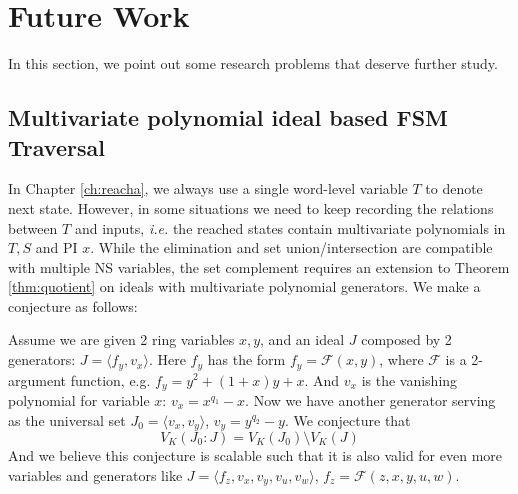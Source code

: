 \section{Future Work}
In this section, we point out some research problems that deserve further study.
\subsection{Multivariate polynomial ideal based FSM Traversal}
In Chapter \ref{ch:reacha}, we always use a single word-level variable $T$ to denote 
next state. However, in some situations we need to keep recording the relations between $T$ and
inputs, {\it i.e.} the reached states contain multivariate polynomials in $T,S$ and PI $x$. 
While the elimination and set union/intersection are compatible with multiple NS variables,
the set complement requires an extension to Theorem \ref{thm:quotient} on ideals with 
multivariate polynomial generators. We make a conjecture as follows:

\begin{Conjecture}
Assume we are given 2 ring variables $x,y$, and an ideal $J$ composed by 2 generators:
$J = \langle f_y, v_x\rangle$. Here $f_y$ has the form $f_y = \mathcal F(x,y)$, where $\mathcal F$
is a 2-argument function, e.g. $f_y = y^2+(1+x)y+x$. And $v_x$ is the vanishing polynomial for variable
$x$: $v_x = x^{q_1} - x$. Now we have another generator serving as the universal set
$J_0 = \langle v_x, v_y\rangle$, $v_y = y^{q_2} - y$.
We conjecture that
$$V_K(J_0:J) = V_K(J_0)\setminus V_K(J)$$
And we believe this conjecture is scalable such that it is also valid for even more variables and generators like 
$J = \langle f_z, v_x,v_y,v_u,v_w\rangle$, $f_z =\mathcal F (z,x,y,u,w)$.
\end{Conjecture}

